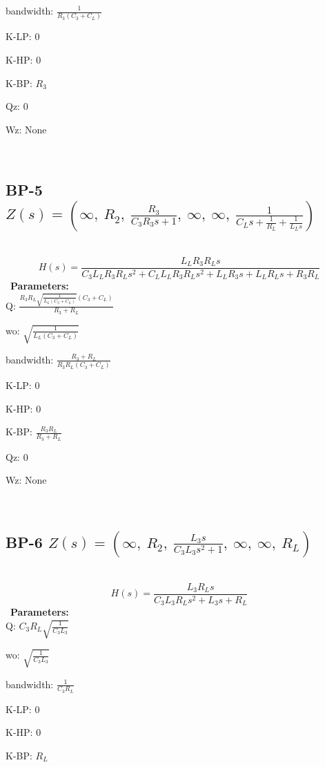\documentclass{article}
\begin{document}
bandwidth: $\frac{1}{R_{3} \left(C_{3} + C_{L}\right)}$\ 

K-LP: $0$\ 

K-HP: $0$\ 

K-BP: $R_{3}$\ 

Qz: $0$\ 

Wz: $\text{None}$\ 

\ 

\subsection{BP-5 $Z(s) = \left( \infty, \  R_{2}, \  \frac{R_{3}}{C_{3} R_{3} s + 1}, \  \infty, \  \infty, \  \frac{1}{C_{L} s + \frac{1}{R_{L}} + \frac{1}{L_{L} s}}\right)$ } \ 
\textbf{\[H(s) = \frac{L_{L} R_{3} R_{L} s}{C_{3} L_{L} R_{3} R_{L} s^{2} + C_{L} L_{L} R_{3} R_{L} s^{2} + L_{L} R_{3} s + L_{L} R_{L} s + R_{3} R_{L}}\] } \ 
\textbf{Parameters:}\\ 

Q: $\frac{R_{3} R_{L} \sqrt{\frac{1}{L_{L} \left(C_{3} + C_{L}\right)}} \left(C_{3} + C_{L}\right)}{R_{3} + R_{L}}$\ 

wo: $\sqrt{\frac{1}{L_{L} \left(C_{3} + C_{L}\right)}}$\ 

bandwidth: $\frac{R_{3} + R_{L}}{R_{3} R_{L} \left(C_{3} + C_{L}\right)}$\ 

K-LP: $0$\ 

K-HP: $0$\ 

K-BP: $\frac{R_{3} R_{L}}{R_{3} + R_{L}}$\ 

Qz: $0$\ 

Wz: $\text{None}$\ 

\ 

\subsection{BP-6 $Z(s) = \left( \infty, \  R_{2}, \  \frac{L_{3} s}{C_{3} L_{3} s^{2} + 1}, \  \infty, \  \infty, \  R_{L}\right)$ } \ 
\textbf{\[H(s) = \frac{L_{3} R_{L} s}{C_{3} L_{3} R_{L} s^{2} + L_{3} s + R_{L}}\] } \ 
\textbf{Parameters:}\\ 

Q: $C_{3} R_{L} \sqrt{\frac{1}{C_{3} L_{3}}}$\ 

wo: $\sqrt{\frac{1}{C_{3} L_{3}}}$\ 

bandwidth: $\frac{1}{C_{3} R_{L}}$\ 

K-LP: $0$\ 

K-HP: $0$\ 

K-BP: $R_{L}$\ 
\end{document}
